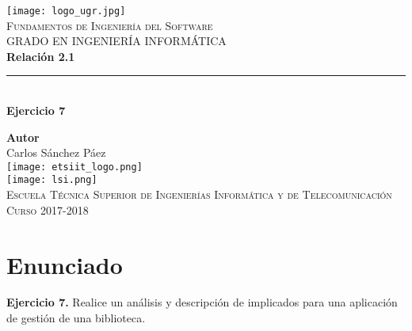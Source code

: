 \documentclass[12pt,spanish]{article}
\begin{document}
\begin{titlepage}

\newlength{\centeroffset}
\setlength{\centeroffset}{-0.5\oddsidemargin}
\addtolength{\centeroffset}{0.5\evensidemargin}
\thispagestyle{empty}

\noindent\hspace*{\centeroffset}\begin{minipage}{\textwidth}

\centering
\texttt{[image: logo\_ugr.jpg]}\\[1.4cm]

\textsc{ \Large Fundamentos de Ingeniería del Software\\[0.2cm]}
\textsc{GRADO EN INGENIERÍA INFORMÁTICA}\\[1cm]

{\Huge\bfseries Relación 2.1\\
}
\noindent\rule[-1ex]{\textwidth}{3pt}\\[3.5ex]
{\large\bfseries Ejercicio 7}
\end{minipage}

\vspace{2.5cm}
\noindent\hspace*{\centeroffset}
\begin{minipage}{\textwidth}
\centering

\textbf{Autor}\\ {Carlos Sánchez Páez}\\[2.5ex]
\texttt{[image: etsiit\_logo.png]}\\[0.1cm]
\vspace{1.5cm}
\texttt{[image: lsi.png]}\\[0.1cm]
\vspace{1cm}
\textsc{Escuela Técnica Superior de Ingenierías Informática y de Telecomunicación}\\
\vspace{1cm}
\textsc{Curso 2017-2018}
\end{minipage}
\end{titlepage}
\tableofcontents
\thispagestyle{empty}
\listoftables
\newpage
\setcounter{page}{1}
\section{Enunciado}
{\large\textbf{Ejercicio 7.} Realice un análisis y descripción de implicados para una aplicación de gestión de una biblioteca.}
\end{document}
